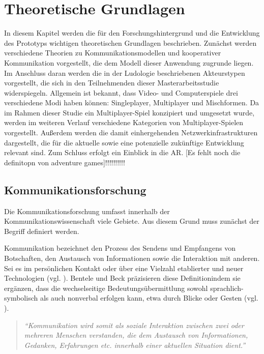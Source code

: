 \chapter{Theoretische Grundlagen}\label{sec:basics}

In diesem Kapitel werden die für den Forschungshintergrund und die Entwicklung des Prototyps wichtigen theoretischen Grundlagen beschrieben.
Zunächst werden verschiedene Theorien zu Kommunikationsmodellen und kooperativer Kommunikation vorgestellt, die dem Modell dieser Anwendung zugrunde liegen.
Im Anschluss daran werden die in der Ludologie beschriebenen Akteurstypen vorgestellt, die sich in den Teilnehmenden dieser Masterarbeitsstudie widerspiegeln.
Allgemein ist bekannt, dass Video- und Computerspiele drei verschiedene Modi haben können: Singleplayer, Multiplayer und Mischformen. Da im Rahmen dieser Studie ein Multiplayer-Spiel konzipiert und umgesetzt wurde, werden im weiteren Verlauf verschiedene Kategorien von Multiplayer-Spielen vorgestellt. Außerdem werden die damit einhergehenden Netzwerkinfrastrukturen dargestellt, die für die aktuelle sowie eine potenzielle zukünftige Entwicklung relevant sind. Zum Schluss erfolgt ein Einblick in die \ac{AR}. [Es fehlt noch die definitopn von adventure games]!!!!!!!!!!

\section{Kommunikationsforschung}

Die Kommunikationsforschung umfasst innerhalb der Kommunikationswissenschaft viele Gebiete. Aus diesem Grund muss zunächst der Begriff  definiert werden.

Kommunikation bezeichnet den Prozess des Sendens und Empfangens von Botschaften, den Austausch von Informationen sowie die Interaktion mit anderen. Sei es im persönlichen Kontakt oder über eine Vielzahl etablierter und neuer Technologien (vgl. \citealp[S. 18]{krcmar_communication_2016}).
Bentele und Beck präzisieren diese Definitionindem sie ergänzen, dass die wechselseitige Bedeutungsübermittlung sowohl sprachlich-symbolisch als auch nonverbal erfolgen kann, etwa durch Blicke oder Gesten (vgl. \citealp[S. 20]{bentele_information_1994}).

\begin{quote}
\textit{\enquote{Kommunikation wird somit als soziale Interaktion zwischen zwei oder mehreren Menschen verstanden, die dem Austausch von Informationen, Gedanken, Erfahrungen etc. innerhalb einer aktuellen Situation dient.}} \cite[S. 19]{becker_praxishandbuch_2018}
\end{quote}

